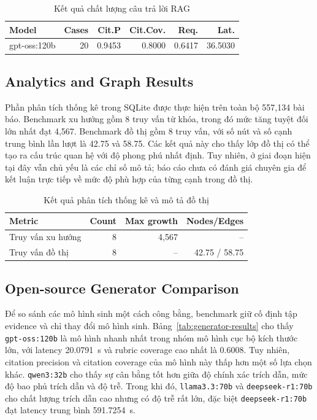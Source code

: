 \documentclass[conference]{IEEEtran}
\begin{document}
\begin{table}[t]
\caption{Kết quả chất lượng câu trả lời RAG}
\label{tab:rag-results}
\centering
\setlength{\tabcolsep}{3pt}
\begin{tabular}{lrrrrr}
\toprule
\textbf{Model} & \textbf{Cases} & \textbf{Cit.P} & \textbf{Cit.Cov.} & \textbf{Req.} & \textbf{Lat.}\\
\midrule
gpt-oss:120b & 20 & 0.9453 & 0.8000 & 0.6417 & 36.5030\\
\bottomrule
\end{tabular}
\end{table}

\subsection{Analytics and Graph Results}

Phần phân tích thống kê trong SQLite được thực hiện trên toàn bộ 557,134 bài báo. Benchmark xu hướng gồm 8 truy vấn từ khóa, trong đó mức tăng tuyệt đối lớn nhất đạt 4,567. Benchmark đồ thị gồm 8 truy vấn, với số nút và số cạnh trung bình lần lượt là 42.75 và 58.75. Các kết quả này cho thấy lớp đồ thị có thể tạo ra cấu trúc quan hệ với độ phong phú nhất định. Tuy nhiên, ở giai đoạn hiện tại đây vẫn chủ yếu là các chỉ số mô tả; báo cáo chưa có đánh giá chuyên gia để kết luận trực tiếp về mức độ phù hợp của từng cạnh trong đồ thị.

\begin{table}[t]
\caption{Kết quả phân tích thống kê và mô tả đồ thị}
\label{tab:analytics-graph}
\centering
\begin{tabular}{lrrr}
\toprule
\textbf{Metric} & \textbf{Count} & \textbf{Max growth} & \textbf{Nodes/Edges}\\
\midrule
Truy vấn xu hướng & 8 & 4,567 & --\\
Truy vấn đồ thị & 8 & -- & 42.75 / 58.75\\
\bottomrule
\end{tabular}
\end{table}

\subsection{Open-source Generator Comparison}

Để so sánh các mô hình sinh một cách công bằng, benchmark giữ cố định tập evidence và chỉ thay đổi mô hình sinh. Bảng~\ref{tab:generator-results} cho thấy \texttt{gpt-oss:120b} là mô hình nhanh nhất trong nhóm mô hình cục bộ kích thước lớn, với latency 20.0791~s và rubric coverage cao nhất là 0.6008. Tuy nhiên, citation precision và citation coverage của mô hình này thấp hơn một số lựa chọn khác. \texttt{qwen3:32b} cho thấy sự cân bằng tốt hơn giữa độ chính xác trích dẫn, mức độ bao phủ trích dẫn và độ trễ. Trong khi đó, \texttt{llama3.3:70b} và \texttt{deepseek-r1:70b} cho chất lượng trích dẫn cao nhưng có độ trễ rất lớn, đặc biệt \texttt{deepseek-r1:70b} đạt latency trung bình 591.7254~s.
\end{document}
